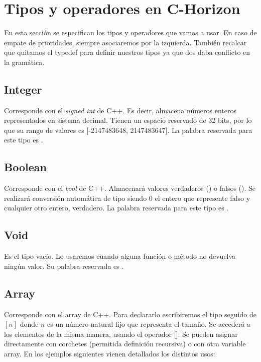 \chapter{Tipos y operadores en C-Horizon}
\label{cap:tipos y operadores}
En esta sección se especifican los tipos y operadores que vamos a usar. En caso de empate de prioridades,
siempre asociaremos por la izquierda.
Tambi\'{e}n recalcar que quitamos el typedef para definir nuestros tipos ya que dos daba conflicto en la gram\'{a}tica.

\section{Integer}
Corresponde con el \textit{signed int} de C++. Es decir, almacena números enteros representados en sistema decimal. Tienen un espacio reservado de 32 bits, 
por lo que su rango de valores es [-2147483648, 2147483647]. La palabra reservada para este tipo es  \Integer.
 
\section{Boolean}
Corresponde con el \textit{bool} de C++. Almacenará valores verdaderos () o falsos (). Se realizará conversión automática de tipo 
\Integer{} siendo $0$ el entero que represente falso y cualquier otro entero, verdadero. La palabra reservada para este tipo es \Boolean.

\section{Void}
Es el tipo vacío. Lo usaremos cuando alguna función o método no devuelva ningún valor. Su palabra reservada es \Void.

\section{Array}
Corresponde con el array de C++. Para declararlo escribiremos el tipo seguido de $[n]$ donde $n$ es un número natural fijo que representa el tamaño. Se accederá a los elementos de la misma
manera, usando el operador []. Se pueden asignar directamente con corchetes (permitida definici\'{o}n recursiva) o con otra variable array.
En los ejemplos siguientes vienen detallados los distintos usos:

